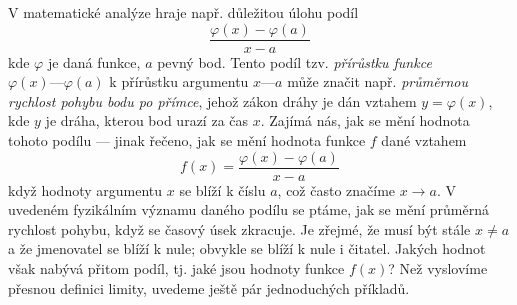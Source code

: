     V matematické analýze hraje např. důležitou úlohu podíl \cite[s.~117]{Brabec1989}
    \begin{equation*}
      \dfrac{\varphi(x) - \varphi(a)}{x - a}
    \end{equation*}
    kde \(\varphi\) je daná funkce, \(a\) pevný bod. Tento podíl tzv. \emph{přírůstku funkce} 
    \(\varphi(x) — \varphi(a)\) k přírůstku argumentu \(x — a\) může značit např. \emph{průměrnou 
    rychlost pohybu bodu po přímce}, jehož zákon dráhy je dán vztahem \(y = \varphi(x)\), kde \(y\) 
    je dráha, kterou bod urazí za čas \(x\). Zajímá nás, jak se mění hodnota tohoto podílu — jinak 
    řečeno, jak se mění hodnota funkce \(f\) dané vztahem
    \begin{equation}\label{mai:eq037}
      f(x) = \dfrac{\varphi(x) - \varphi(a)}{x - a}
    \end{equation}
    když hodnoty argumentu \(x\) se blíží k číslu \(a\), což často značíme \(x\rightarrow a\). V 
    uvedeném fyzikálním významu daného podílu se ptáme, jak se mění průměrná rychlost pohybu, když 
    se časový úsek zkracuje. Je zřejmé, že musí být stále \(x \neq a\) a že jmenovatel se blíží k 
    nule; obvykle se blíží k nule i čitatel. Jakých hodnot však nabývá přitom podíl, tj. jaké jsou 
    hodnoty funkce \(f(x)\)? Než vyslovíme přesnou definici limity, uvedeme ještě pár jednoduchých 
    příkladů.

      

